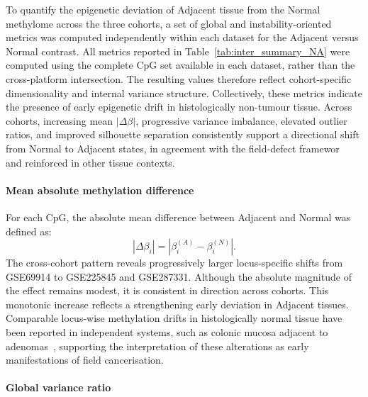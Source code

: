 To quantify the epigenetic deviation of Adjacent tissue from the Normal methylome across the three cohorts, a set of global and instability-oriented metrics was computed independently within each dataset for the Adjacent versus Normal contrast.
All metrics reported in Table~\ref{tab:inter_summary_NA} were computed using the complete CpG set available in each dataset, rather than the cross-platform intersection. The resulting values therefore reflect cohort-specific dimensionality and internal variance structure.
Collectively, these metrics indicate the presence of early epigenetic drift in histologically non-tumour tissue. Across cohorts, increasing mean $|\Delta\beta|$, progressive variance imbalance, elevated outlier ratios, and improved silhouette separation consistently support a directional shift from Normal to Adjacent states, in agreement with the field-defect framewor~\cite{Teschendorff2016fielddefects} and reinforced in other tissue contexts.

\paragraph{Mean absolute methylation difference}  

For each CpG, the absolute mean difference between Adjacent and Normal was defined as:
\begin{equation}
|\Delta\beta_i| = \left| \beta^{(A)}_i - \beta^{(N)}_i \right|.
\label{eq:mean_abs_delta_beta}
\end{equation}
The cross-cohort pattern reveals progressively larger locus-specific shifts from GSE69914 to GSE225845 and GSE287331.  
Although the absolute magnitude of the effect remains modest, it is consistent in direction across cohorts.  
This monotonic increase reflects a strengthening early deviation in Adjacent tissues. Comparable locus-wise methylation drifts in histologically normal tissue have been reported in independent systems, such as colonic mucosa adjacent to adenomas~\cite{Yates2024_NormalMucosaField}, supporting the interpretation of these alterations as early manifestations of field cancerisation.

\paragraph{Global variance ratio}  

